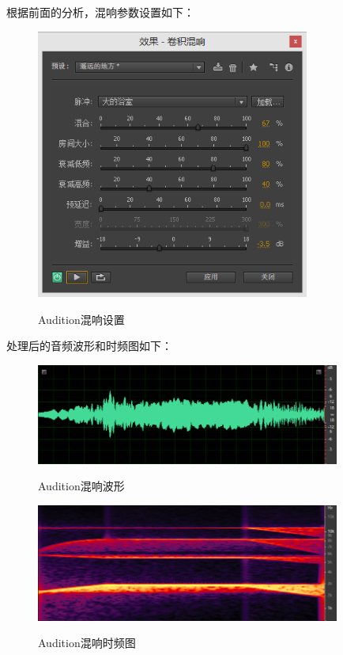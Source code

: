 \documentclass{article}
\begin{document}
            根据前面的分析，混响参数设置如下：
            \begin{figure}[htb]
                \centering
                \includegraphics[width=9cm]{figure13.png}
                \label{fig:reverb1-1}\caption{Audition混响设置}
            \end{figure}

            处理后的音频波形和时频图如下：
            \begin{figure}[htb]
                \centering
                \includegraphics[width=10cm]{figure14.png}
                \label{fig:reverb1-2}\caption{Audition混响波形}
            \end{figure}
            \begin{figure}[htb]
                \centering
                \includegraphics[width=10cm]{figure15.png}
                \label{fig:reverb1-3}\caption{Audition混响时频图}
            \end{figure}
\end{document}
